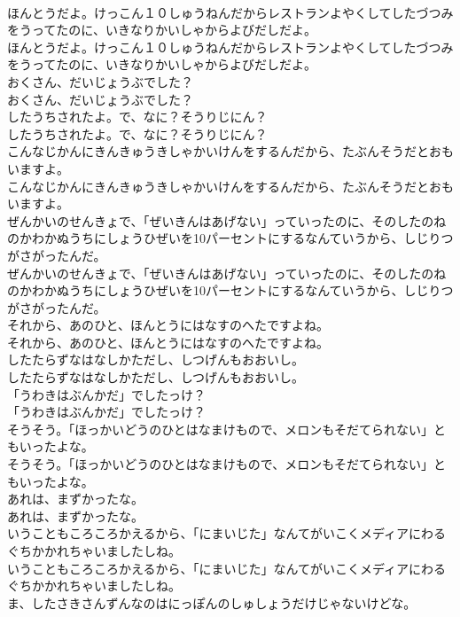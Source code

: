 \documentclass[8pt]{extreport}
\begin{document}
\begin{CJK}{UTF8}{min}
\\	ほんとうだよ。けっこん１０しゅうねんだからレストランよやくしてしたづつみをうってたのに、いきなりかいしゃからよびだしだよ。
\\	ほんとうだよ。けっこん１０しゅうねんだからレストランよやくしてしたづつみをうってたのに、いきなりかいしゃからよびだしだよ。
\\	おくさん、だいじょうぶでした？
\\	おくさん、だいじょうぶでした？
\\	したうちされたよ。で、なに？そうりじにん？
\\	したうちされたよ。で、なに？そうりじにん？
\\	こんなじかんにきんきゅうきしゃかいけんをするんだから、たぶんそうだとおもいますよ。
\\	こんなじかんにきんきゅうきしゃかいけんをするんだから、たぶんそうだとおもいますよ。
\\	ぜんかいのせんきょで、「ぜいきんはあげない」っていったのに、そのしたのねのかわかぬうちにしょうひぜいを10パーセントにするなんていうから、しじりつがさがったんだ。
\\	ぜんかいのせんきょで、「ぜいきんはあげない」っていったのに、そのしたのねのかわかぬうちにしょうひぜいを10パーセントにするなんていうから、しじりつがさがったんだ。
\\	それから、あのひと、ほんとうにはなすのへたですよね。
\\	それから、あのひと、ほんとうにはなすのへたですよね。
\\	したたらずなはなしかただし、しつげんもおおいし。
\\	したたらずなはなしかただし、しつげんもおおいし。
\\	「うわきはぶんかだ」でしたっけ？
\\	「うわきはぶんかだ」でしたっけ？
\\	そうそう。「ほっかいどうのひとはなまけもので、メロンもそだてられない」ともいったよな。
\\	そうそう。「ほっかいどうのひとはなまけもので、メロンもそだてられない」ともいったよな。
\\	あれは、まずかったな。
\\	あれは、まずかったな。
\\	いうこともころころかえるから、「にまいじた」なんてがいこくメディアにわるぐちかかれちゃいましたしね。
\\	いうこともころころかえるから、「にまいじた」なんてがいこくメディアにわるぐちかかれちゃいましたしね。
\\	ま、したさきさんずんなのはにっぽんのしゅしょうだけじゃないけどな。

\end{CJK}
\end{document}
